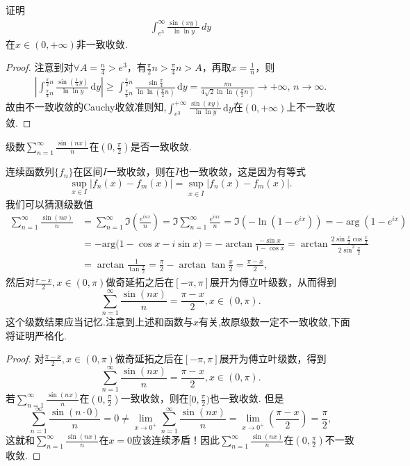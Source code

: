 \documentclass[../../main.tex]{subfiles}%
\begin{document}
\begin{example}
证明
\begin{align*}
\int_{e^3}^{\infty} \frac{\sin(xy)}{\ln \ln y} \, dy
\end{align*}
在$x \in (0, +\infty)$非一致收敛.
\end{example}
\begin{proof}
注意到对$\forall A= \frac{n}{4}>e^3$，有$\frac{\pi}{2}n>\frac{\pi}{4}n>A$，再取$x=\frac{1}{n}$，则
\begin{align*}
\left| \int_{\frac{\pi}{4}n}^{\frac{\pi}{2}n} \frac{\sin \left( \frac{1}{n}y \right)}{\ln\ln y} \,\mathrm{d}y \right| \geqslant \int_{\frac{\pi}{4}n}^{\frac{\pi}{2}n} \frac{\sin \frac{\pi}{4}}{\ln\ln \left( \frac{\pi}{2}n \right)} \,\mathrm{d}y = \frac{\pi n}{4\sqrt{2}\ln\ln \left( \frac{\pi}{2}n \right)} \rightarrow +\infty,\,n\rightarrow \infty.
\end{align*}
故由不一致收敛的Cauchy收敛准则知,$\int_{e^3}^{+\infty} \frac{\sin \left( xy \right)}{\ln\ln y} \,\mathrm{d}y$在$\left( 0,+\infty \right)$上不一致收敛.
\end{proof}

\begin{example}
级数\(\sum_{n=1}^{\infty} \frac{\sin(nx)}{n}\)在\((0, \frac{\pi}{2})\)是否一致收敛.
\end{example}
\begin{note}
连续函数列\(\{f_n\}\)在区间\(I\)一致收敛，则在\(\overline{I}\)也一致收敛，这是因为有等式
\[
\sup_{x \in I} |f_n(x) - f_m(x)| = \sup_{x \in \overline{I}} |f_n(x) - f_m(x)|.
\]
我们可以猜测级数值
\begin{align*}
\sum_{n=1}^{\infty} \frac{\sin(nx)}{n} &= \sum_{n=1}^{\infty} \Im \left( \frac{e^{inx}}{n} \right) = \Im \sum_{n=1}^{\infty} \frac{e^{inx}}{n} = \Im (-\ln(1 - e^{ix})) = -\arg(1 - e^{ix}) \\
&= -\mathrm{arg(}1-\cos x-i\sin x)=-\arctan  \frac{-\sin x}{1-\cos x}=\arctan  \frac{2\sin \frac{x}{2}\cos \frac{x}{2}}{2\sin ^2\frac{x}{2}}\\
&= \arctan  \frac{1}{\tan \frac{x}{2}}=\frac{\pi}{2}-\arctan \tan \frac{x}{2}=\frac{\pi -x}{2},
\end{align*}
然后对\(\frac{\pi - x}{2}, x \in (0, \pi)\)做奇延拓之后在\([-\pi, \pi]\)展开为傅立叶级数，从而得到
\[
\sum_{n=1}^{\infty} \frac{\sin(nx)}{n} = \frac{\pi - x}{2}, x \in (0, \pi).
\]
这个级数结果应当记忆.注意到上述和函数与$x$有关,故原级数一定不一致收敛,下面将证明严格化.
\end{note}
\begin{proof}
对\(\frac{\pi - x}{2}, x \in (0, \pi)\)做奇延拓之后在\([-\pi, \pi]\)展开为傅立叶级数，得到
\[
\sum_{n=1}^{\infty} \frac{\sin(nx)}{n} = \frac{\pi - x}{2}, x \in (0, \pi).
\]
若\(\sum_{n=1}^{\infty} \frac{\sin(nx)}{n}\)在\((0, \frac{\pi}{2})\)一致收敛，则在\([0, \frac{\pi}{2})\)也一致收敛. 但是
\[
\sum_{n=1}^{\infty} \frac{\sin(n \cdot 0)}{n} =0 \neq \lim_{x \to 0^+} \sum_{n=1}^{\infty} \frac{\sin(nx)}{n} = \lim_{x \to 0^+} \left( \frac{\pi - x}{2} \right) = \frac{\pi}{2},
\]
这就和\(\sum_{n=1}^{\infty} \frac{\sin(nx)}{n}\)在\(x = 0\)应该连续矛盾！因此\(\sum_{n=1}^{\infty} \frac{\sin(nx)}{n}\)在\((0, \frac{\pi}{2})\)不一致收敛.
\end{proof}
\end{document}
